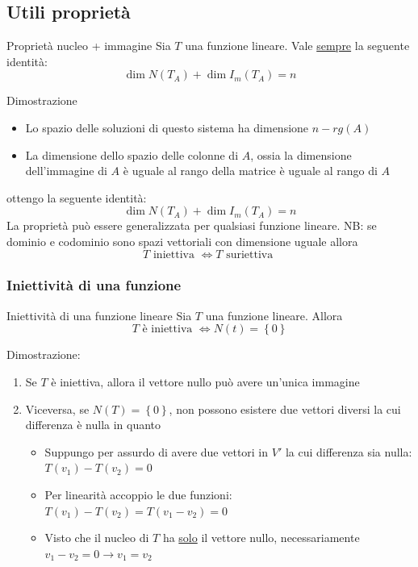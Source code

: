 \subsection{Utili proprietà}
\begin{teorema}{Proprietà nucleo + immagine}
	Sia $ T $ una funzione lineare. Vale \underline{sempre} la seguente identità:
	\[
		\dim N\left( T_A \right)  + \dim I_m \left( T_A \right) = n
	\]
\end{teorema}
Dimostrazione
\begin{itemize}
	\item Lo spazio delle soluzioni di questo sistema ha dimensione $ n- rg\left( A \right)  $
	\item La dimensione dello spazio delle colonne di $ A $, ossia la dimensione dell'immagine di $ A $ è uguale al rango della matrice è uguale al rango di $ A $
\end{itemize}
ottengo la seguente identità:
\[
	\dim N\left( T_A \right)  + \dim I_m \left( T_A \right) = n
\]
La proprietà può essere generalizzata per qualsiasi funzione lineare.
\vskip3mm
NB: se dominio e codominio sono spazi vettoriali con dimensione uguale allora
\[
	T \text{ iniettiva } \Leftrightarrow T \text{ suriettiva }
\]
\subsubsection*{Iniettività di una funzione}
\begin{teorema}{Iniettività di una funzione lineare}
	Sia $  T $ una funzione lineare. Allora
	\[
		T \text{ è iniettiva } \Leftrightarrow N\left( t \right) = \left\{ 0 \right\}
	\]
\end{teorema}
Dimostrazione:
\begin{enumerate}
	\item Se $ T $ è iniettiva, allora il vettore nullo può avere un'unica immagine
	\item Viceversa, se $ N\left( T \right) = \left\{ 0 \right\}  $, non possono esistere due vettori diversi la cui differenza è nulla in quanto
	      \begin{itemize}
		      \item Suppungo per assurdo di avere due vettori in $ V' $ la cui differenza sia nulla: $ T\left( v_1 \right) -T\left( v_2 \right) =0 $
		      \item Per linearità accoppio le due funzioni:  $ T\left( v_1 \right) -T\left( v_2 \right) = T\left( v_1-v_2 \right) =0 $
		      \item Visto che il nucleo di $ T $ ha \underline{solo} il vettore nullo, necessariamente $ v_1-v_2=0 \rightarrow v_1=v_2 $
	      \end{itemize}
\end{enumerate}

